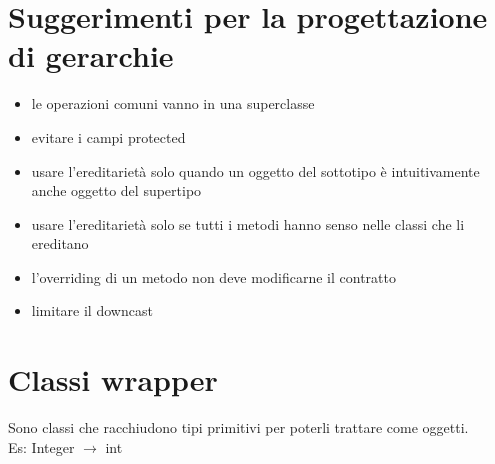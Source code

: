 \section{Suggerimenti per la progettazione di gerarchie} %
\begin{itemize}
\item le operazioni comuni vanno in una superclasse
\item evitare i campi protected
\item usare l'ereditarietà solo quando un oggetto del sottotipo è intuitivamente anche oggetto del supertipo
\item usare l'ereditarietà solo se tutti i metodi hanno senso nelle classi che li ereditano
\item l'overriding di un metodo non deve modificarne il contratto
\item limitare il downcast
\end{itemize}

\section{Classi wrapper} %
Sono classi che racchiudono tipi primitivi per poterli trattare come oggetti.\\
Es: Integer $\rightarrow$ int

